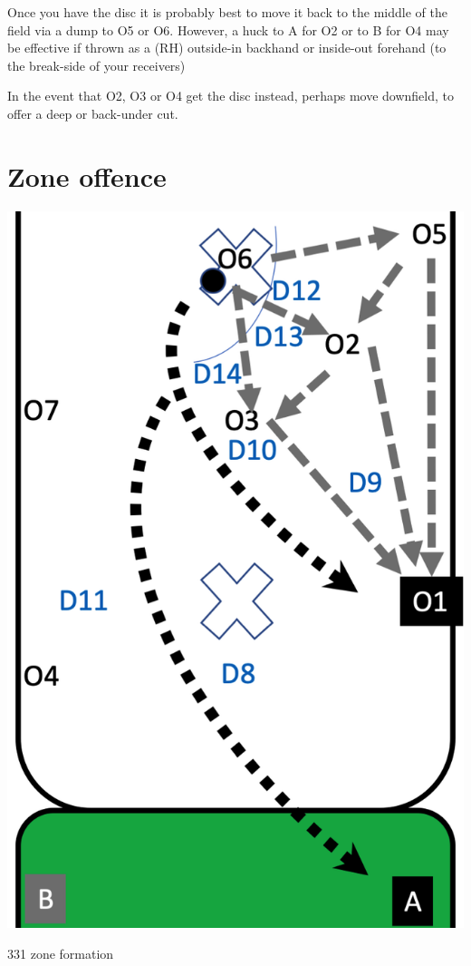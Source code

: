 \documentclass{tufte-handout}
\begin{document}
Once you have the disc 
it is probably best 
to move it 
back to the middle of the field 
via a dump to O5 or O6. 
However, a huck to 
A for O2 or 
to B for O4 
may be effective 
if thrown as 
a (RH) outside-in backhand or
inside-out forehand 
(to the break-side of your receivers)

In the event that 
O2, O3 or O4 
get the disc
instead, perhaps
move downfield,
to offer a deep 
or back-under cut. 

\section{Zone offence}\label{sec:zone}

\begin{marginfigure}%
  \includegraphics[width=\linewidth]{O1-zone331}
  \caption{331 zone formation}
  \label{fig:O1-zone331}
\end{marginfigure}
\end{document}
